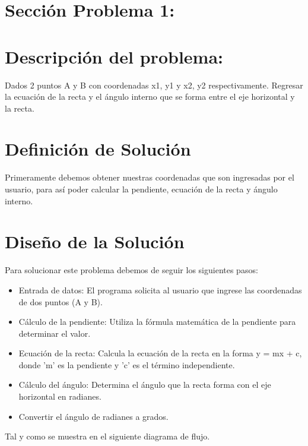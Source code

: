 \documentclass{IEEEcsmag}
\begin{document}
\section{Sección Problema 1: }
\section*{Descripción del problema:}Dados 2 puntos A y B con coordenadas x1, y1 y x2, y2 respectivamente. Regresar la ecuación de la recta y el ángulo interno que se forma entre el eje horizontal y la recta.

\section*{Definición de Solución} Primeramente debemos obtener nuestras coordenadas que son ingresadas por el usuario, para así poder calcular la pendiente, ecuación de la recta y ángulo interno.

\section*{Diseño de la Solución}{}
Para solucionar este problema debemos de seguir los siguientes pasos: 
\begin{itemize}
    \item Entrada de datos: 
El programa solicita al usuario que ingrese las coordenadas de dos puntos (A y B).
    \item Cálculo de la pendiente:
Utiliza la fórmula matemática de la pendiente para determinar el valor.
    \item Ecuación de la recta: 
Calcula la ecuación de la recta en la forma y = mx + c, donde 'm' es la pendiente y 'c' es el término independiente.
    \item Cálculo del ángulo: 
Determina el ángulo que la recta forma con el eje horizontal en radianes. 
    \item Convertir el ángulo de radianes a grados.
\end{itemize}
Tal y como se muestra en el siguiente diagrama de flujo.
\end{document}
